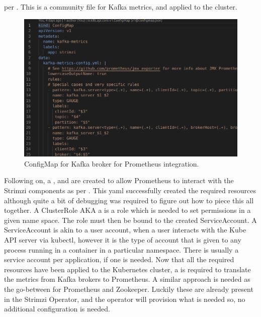 per . This is a community file for Kafka metrics, and applied to the cluster.
\begin{figure}[H]
	\centering
	\includegraphics[width=0.9\linewidth]{figures/prom_kafka_broker_config_map.png}
	\caption{ConfigMap for Kafka broker for Prometheus integration.}
	\label{fig:prom_kafka_broker_config_map}
\end{figure}
Following on, a ,  and  are created to allow Prometheus to interact with the
Strimzi components as per . This yaml successfully created the required resources although quite a bit of debugging
was required to figure out how to piece this all together. A ClusterRole AKA a  is a role which
is needed to set permissions in a given name space. The role must then be bound to the created ServiceAccount. A ServiceAccount is akin to
a user account, when a user interacts with the Kube API server via kubectl, however it is the type of account that is given to any process
running in a container in a particular namespace. There is usually a service account per application, if one is needed.
\bigbreak
Now that all the required resources have been applied to the Kubernetes cluster, a \autocite{JMXExporter2022} is required to translate the metrics
from Kafka brokers to Prometheus. A similar approach is needed as the go-between for Prometheus and Zookeeper. Luckily these are already present
in the Strimzi Operator, and the operator will provision what is needed so, no additional configuration is needed.
